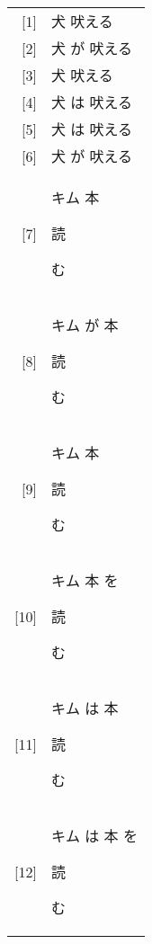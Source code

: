 \documentclass[a4paper]{article}
\begin{document}
\begin{tabular}[t]{rl}
{[1]} & 犬 吠える \\
{[2]} & 犬 が 吠える \\
{[3]} & 犬 吠える \\
{[4]} & 犬 は 吠える \\
{[5]} & 犬 は 吠える \\
{[6]} & 犬 が 吠える \\
{[7]} & キム 本 \begin{japanese}読\end{japanese}む \\
{[8]} & キム が 本 \begin{japanese}読\end{japanese}む \\
{[9]} & キム 本 \begin{japanese}読\end{japanese}む \\ 
{[10]} & キム 本 を \begin{japanese}読\end{japanese}む \\ 
{[11]} & キム は 本 \begin{japanese}読\end{japanese}む \\ 
{[12]} & キム は 本 を \begin{japanese}読\end{japanese}む \\ 
\end{tabular}
\end{document}
